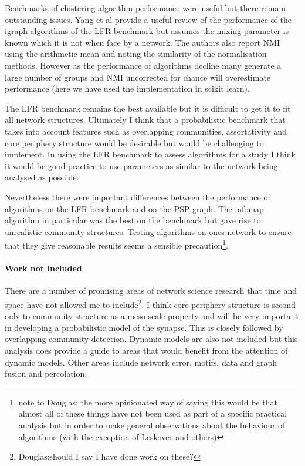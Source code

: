 Benchmarks of clustering algorithm performance were useful but there remain outstanding issues. Yang et al \cite{yang2016comparative} provide a useful review of the performance of the igraph algorithms of the LFR benchmark but assumes the mixing parameter is known which it is not when face by a network. The authors also report NMI using the arithmetic mean and noting the similarity of the normalisation methods. However as the performance of algorithms decline many generate a large number of groups and NMI uncorrected for chance will overestimate performance (here we have used the implementation in scikit learn).

The LFR benchmark remains the best available but it is difficult to get it to fit all network structures. Ultimately I think that a probabilistic benchmark that takes into account features such as overlapping communities, assortativity and core periphery structure would be desirable but would be challenging to implement. In using the LFR benchmark to assess algorithms for a study I think it would be good practice to use parameters as similar to the network being analysed as possible. 

Nevertheless there were important differences between the performance of algorithms on the LFR benchmark and on the PSP graph. The infomap algorithm in particular was the best on the benchmark but gave rise to unrealistic community structures. Testing algorithms on ones network to ensure that they give reasonable results seems a sensible precaution\footnote{note to Douglas: the more opinionated way of saying this would be that almost all of these things have not been used as part of a specific practical analysis but in order to make general observations about the behaviour of algorithms (with the exception of Leskovec\cite{leskovec2010empirical} and others)}. 



 \paragraph{Work not included}
There are a number of promising areas of network science research that time and space have not allowed me to include\footnote{Douglas:should I say I have done work on these?}. I think core periphery structure is second only to community structure as a meso-scale property and will be very important in developing a probabilistic model of the synapse. This is closely followed by overlapping community detection.  Dynamic models are also not included but this analysis does provide a guide to areas that would benefit from the attention of dynamic models. Other areas include network error, motifs, data and graph fusion and percolation. 
 
